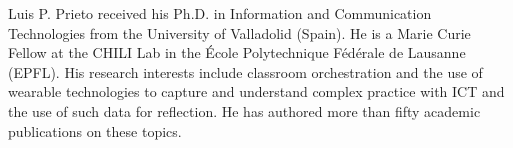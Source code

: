 \documentclass[10pt,journal,compsoc]{IEEEtran}
\begin{document}
% 

%
%
%
%


\begin{IEEEbiography}{Luis P. Prieto} received his Ph.D. in Information and Communication Technologies from the University of Valladolid (Spain). He is a Marie Curie Fellow at the CHILI Lab in the \'Ecole Polytechnique F\'ed\'erale de Lausanne (EPFL). His research interests include classroom orchestration and the use of wearable technologies to capture and understand complex practice with ICT and the use of such data for reflection. He has authored more than fifty academic publications on these topics.
\end{IEEEbiography}
\end{document}

